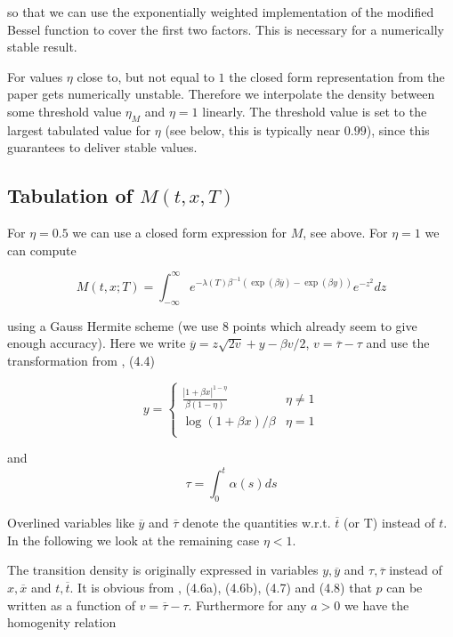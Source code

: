 \documentclass{amsart}
\theoremstyle{plain}
\numberwithin{equation}{section}
\begin{document}
so that we can use the exponentially weighted implementation of the modified Bessel function to cover the first two factors. This is necessary for a numerically stable result.

For values $\eta$ close to, but not equal to $1$ the closed form representation from the paper gets numerically unstable. Therefore we interpolate the density between some threshold value $\eta_M$ and $\eta=1$ linearly. The threshold value is set to the largest tabulated value for $\eta$ (see below, this is typically near $0.99$), since this guarantees to deliver stable values.


\subsection{Tabulation of $M(t,x,T)$}

For $\eta=0.5$ we can use a closed form expression for $M$, see above. For $\eta=1$ we can compute

\begin{equation}\label{M_eta_1}
M(t,x;T) = \int_{-\infty}^\infty e^{-\lambda(T)\beta^{-1} (\exp(\beta \overline{y}) - \exp(\beta y))} e^{-z^2} dz
\end{equation}

using a Gauss Hermite scheme (we use $8$ points which already seem to give enough accuracy). Here we write $\overline{y} = z\sqrt{2v} + y - \beta v / 2$, $v=\overline{\tau}-\tau$ and use the transformation from \cite{betaeta}, (4.4)

\begin{equation}
y = \begin{cases}
\frac{|1+\beta x|^{1-\eta}}{\beta(1-\eta)} & \eta\neq 1 \\
\log(1+\beta x)/\beta & \eta=1 \\
\end{cases}
\end{equation}

and
\begin{equation}
\tau = \int_0^{t} \alpha(s) ds
\end{equation}

Overlined variables like $\overline{y}$ and $\overline{\tau}$ denote the quantities w.r.t. $\overline{t}$ (or T) instead of $t$. In the following we look at the remaining case $\eta < 1$.

The transition density is originally expressed in variables $y, \overline{y}$ and $\tau, \overline{\tau}$ instead of $x, \overline{x}$ and $t, \overline{t}$. It is obvious from \cite{betaeta}, (4.6a), (4.6b), (4.7) and (4.8) that $p$ can be written as a function of $v = \overline{\tau}-\tau$. Furthermore for any $a > 0$ we have the homogenity relation
\end{document}
